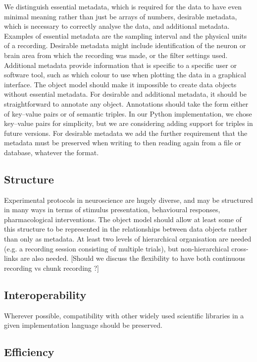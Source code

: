 \documentclass{frontiers}
\newcommand{\samuel}[1]{[\textcolor{RubineRed}{#1}]}
\begin{document}
We distinguish essential metadata, which is required for the data to have even minimal meaning rather than just be arrays of numbers, desirable metadata, which is necessary to correctly analyse the data, and additional metadata.
Examples of essential metadata are the sampling interval and the physical units of a recording.
Desirable metadata might include identification of the neuron or brain area from which the recording was made, or the filter settings used.
Additional metadata provide information that is specific to a specific user or software tool, such as which colour to use when plotting the data in a graphical interface.
The object model should make it impossible to create data objects without essential metadata.
For desirable and additional metadata, it should be straightforward to annotate any object. 
Annotations should take the form either of key--value pairs or of semantic triples. 
In our Python implementation, we chose key--value pairs for simplicity, but we are considering adding support for triples in future versions.
For desirable metadata we add the further requirement that the metadata must be preserved when writing to then reading again from a file or database, whatever the format.

\subsection{Structure}

Experimental protocols in neuroscience are hugely diverse, and may be structured in many ways in terms of stimulus presentation, behavioural responses, pharmacological interventions. The object model should allow at least some of this structure to be represented in the relationships between data objects rather than only as metadata. At least two levels of hierarchical organisation are needed (e.g. a recording session consisting of multiple trials), but non-hierarchical cross-links are also needed.
\samuel{Should we discuss the flexibility to have both continuous recording vs chunk recording ?}

\subsection{Interoperability}

Wherever possible, compatibility with other widely used scientific libraries in a given implementation language should be preserved.

\subsection{Efficiency}
\end{document}
